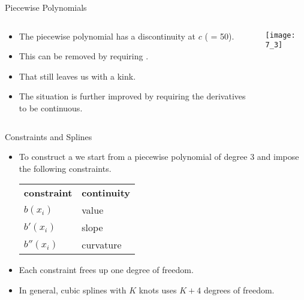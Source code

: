 \documentclass[mathserif, aspectratio=169]{beamer}
\begin{document}
\begin{frame}{Piecewise Polynomials}
	\begin{columns}
		\begin{column}{0.5\textwidth}
			\begin{itemize}
				\item The piecewise polynomial has a discontinuity at $c$ ( = 50).
				\item This can be removed by requiring .
				\item That still leaves us with a kink.
				\item The situation is further improved by requiring 
					the derivatives to be continuous.
			\end{itemize}
		\end{column}
		\begin{column}{0.5\textwidth}
			\begin{center}
				\texttt{[image: 7\_3]}
			\end{center}
		\end{column}
	\end{columns}
\end{frame}

\begin{frame}{Constraints and Splines}
	\begin{itemize}
		\item To construct a  we start from a piecewise polynomial
			of degree 3 and impose the following constraints.
			\begin{popblock}{0.4\textwidth}{}
				\begin{tabular}[h]{ll}
					{\bfseries\blue constraint} & {\bfseries\blue continuity} \\
					$b(x_i)$ & value \\
					$b'(x_i)$ & slope \\
					$b''(x_i)$ & curvature\\
				\end{tabular}
			\end{popblock}
		\item Each constraint frees up one degree of freedom.
		\item In general, cubic splines with $K$ knots uses $K+4$ degrees of freedom.
	\end{itemize}
\end{frame}
\end{document}
